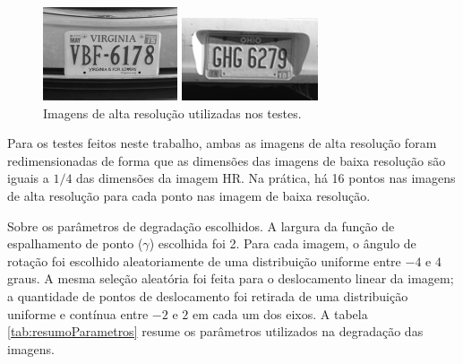 \begin{figure}[h]
	\centering
	\caption{\label{fig:hrimage}Imagens de alta resolução utilizadas nos testes.}
	\begin{minipage}[b]{.48\linewidth}
		\centering
		\includegraphics{figures/imtestes.png}
	\end{minipage}
	\begin{minipage}[b]{.48\linewidth}
		\centering
		\includegraphics{figures/imteste2s.png}
	\end{minipage}

\end{figure}

Para os testes feitos neste trabalho, ambas as imagens de alta resolução foram
redimensionadas de forma que as dimensões das imagens de baixa resolução são iguais a
$1/4$ das dimensões da imagem HR.  
Na prática, há 16 pontos nas imagens de alta resolução para cada ponto nas imagem de
baixa resolução.

Sobre os parâmetros de degradação escolhidos. A largura da função de espalhamento de ponto ($\gamma$) escolhida foi 2.
Para cada imagem, o ângulo de rotação foi escolhido aleatoriamente de uma distribuição uniforme entre $-4$ e $4$ graus.
A mesma seleção aleatória foi feita para o deslocamento linear da imagem; a quantidade de pontos de deslocamento foi retirada de uma distribuição uniforme e contínua entre $-2$ e $2$ em cada um dos eixos.
A tabela \ref{tab:resumoParametros} resume os parâmetros utilizados na degradação das imagens.

